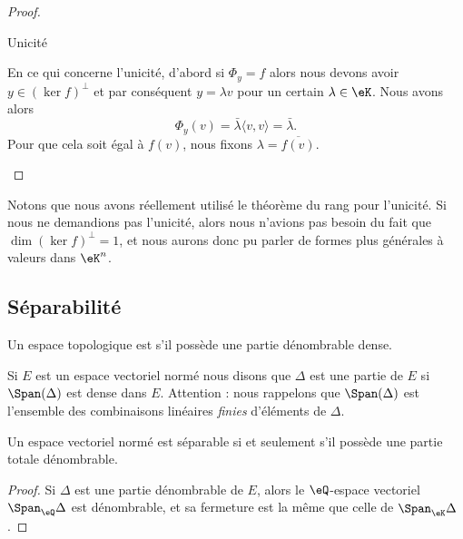\begin{proof}
\begin{subproof}
\item[Unicité]

    En ce qui concerne l'unicité, d'abord si \(  \Phi_y= f\) alors nous devons avoir \( y\in(\ker f)^{\perp}\) et par conséquent \( y=\lambda v\) pour un certain \( \lambda\in \eK\). Nous avons alors
    \begin{equation}
         \Phi_y(v)=\bar\lambda\langle v, v\rangle =\bar\lambda.
    \end{equation}
    Pour que cela soit égal à \(  f(v)\), nous fixons \( \lambda=\overline{  f(v) }\).
    \end{subproof}
\end{proof}
Notons que nous avons réellement utilisé le théorème du rang pour l'unicité. Si nous ne demandions pas l'unicité, alors nous n'avions pas besoin du fait que \( \dim(\ker f)^{\perp}=1\), et nous aurons donc pu parler de formes plus générales à valeurs dans \( \eK^n\).

\subsection{Séparabilité}

\begin{definition}      \label{DEFooSFOJooGICSbT}
    Un espace topologique est  s'il possède une partie dénombrable dense.
\end{definition}

\begin{definition}      \label{DEFooQVPHooJaSWyF}
    Si \( E\) est un espace vectoriel normé nous disons que \( \Delta\) est une partie  de \( E\) si \( \Span(\Delta)\) est dense dans \( E\). Attention : nous rappelons que \( \Span(\Delta)\) est l'ensemble des combinaisons linéaires \emph{finies} d'éléments de \( \Delta\).
\end{definition}

\begin{proposition}     \label{PROPooZMWHooVwvNBY}
    Un espace vectoriel normé est séparable si et seulement s'il possède une partie totale dénombrable.
\end{proposition}

\begin{proof}
    Si \( \Delta\) est une partie dénombrable de \( E\), alors le \( \eQ\)-espace vectoriel \( \Span_{\eQ}\Delta\) est dénombrable, et sa fermeture est la même que celle de \( \Span_{\eK}\Delta\).
\end{proof}


